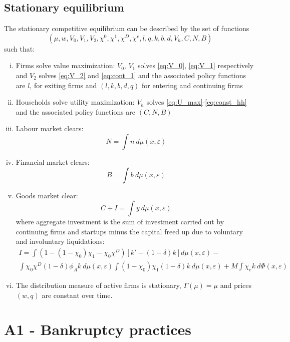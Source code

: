 \documentclass[12pt]{article}
\begin{document}
\subsection{Stationary equilibrium}\label{sec:eq}
The stationary competitive equilibrium can be described by the set of functions
$$(\mu, w, V_0, V_1, V_2, \chi^0, \chi^1, \chi^D, \chi^e, l,q,k,b,d, V_h, C, N, B)$$
such that: 
\begin{enumerate}[(i)]
\item Firms solve value maximization: $V_0$, $V_1$ solves \ref{eq:V_0}, \ref{eq:V_1} respectively and $V_2$ solves \ref{eq:V_2} and \ref{eq:cont_1} and the associated policy functions are $l$, for exiting firms and $(l,k,b,d,q)$ for entering and continuing firms
\item Households solve utility maximization: $V_h$ solves \ref{eq:U_max}-\ref{eq:const_hh} and the associated policy functions are $( C, N, B)$
\item Labour market clears: 
$$ N = \int n  \ d \mu (x,\varepsilon)  $$
\item Financial market clears:
 $$ B = \int b \ d \mu (x,\varepsilon) $$
\item Goods market clear: 
$$ C + I = \int y \ d \mu (x,\varepsilon)$$
where aggregate investment is the sum of investment carried out by continuing firms and startups minus the capital freed up due to voluntary and involuntary liquidations:
\begin{multline*} 
    I = \int (1-(1-\chi_0)\chi_1-\chi_0\chi^D)\left[ k' -(1-\delta)k \right] d \mu (x,\varepsilon) - \\
    \int \chi_0\chi^D (1-\delta) \phi_A k \ d \mu (x,\varepsilon) \int (1-\chi_0)\chi_1(1-\delta) k \ d \mu (x,\varepsilon)  + M \int \chi_e k \ d \Phi(x,\varepsilon) 
\end{multline*}
\item The distribution measure of active firms is stationary, $\Gamma(\mu) = \mu$ and prices $(w,q)$ are constant over time.
\end{enumerate}

\section{A1 - Bankruptcy practices \label{sec: qualitative analysis}}
\end{document}
